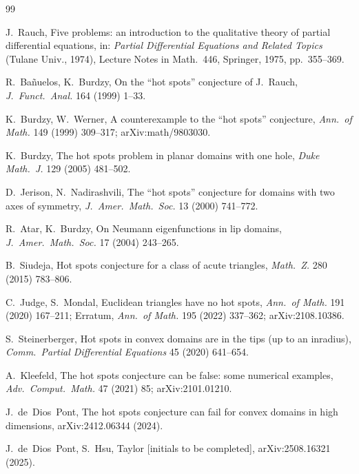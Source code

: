 \documentclass[11pt]{article}
\begin{document}
\begin{thebibliography}{99}\small

 J.~Rauch, Five problems: an introduction to the
qualitative theory of partial differential equations, in:
\emph{Partial Differential Equations and Related Topics} (Tulane
Univ., 1974), Lecture Notes in Math.\ 446, Springer, 1975, pp.~355--369.

 R.~Ba\~nuelos, K.~Burdzy, On the ``hot
spots'' conjecture of J.~Rauch, \emph{J.\ Funct.\ Anal.} 164 (1999)
1--33.

 K.~Burdzy, W.~Werner, A counterexample to the
``hot spots'' conjecture, \emph{Ann.\ of Math.} 149 (1999) 309--317;
arXiv:math/9803030.

 K.~Burdzy, The hot spots problem in planar
domains with one hole, \emph{Duke Math.\ J.} 129 (2005) 481--502.

 D.~Jerison, N.~Nadirashvili, The ``hot
spots'' conjecture for domains with two axes of symmetry, \emph{J.\
Amer.\ Math.\ Soc.} 13 (2000) 741--772.

 R.~Atar, K.~Burdzy, On Neumann eigenfunctions in
lip domains, \emph{J.\ Amer.\ Math.\ Soc.} 17 (2004) 243--265.

 B.~Siudeja, Hot spots conjecture for a class of
acute triangles, \emph{Math.\ Z.} 280 (2015) 783--806.

 C.~Judge, S.~Mondal, Euclidean triangles have no
hot spots, \emph{Ann.\ of Math.} 191 (2020) 167--211; Erratum,
\emph{Ann.\ of Math.} 195 (2022) 337--362; arXiv:2108.10386.

 S.~Steinerberger, Hot spots in convex domains
are in the tips (up to an inradius), \emph{Comm.\ Partial Differential
Equations} 45 (2020) 641--654.

 A.~Kleefeld, The hot spots conjecture can be false:
some numerical examples, \emph{Adv.\ Comput.\ Math.} 47 (2021) 85;
arXiv:2101.01210.

 J.~de~Dios~Pont, The hot spots conjecture can fail for
convex domains in high dimensions, arXiv:2412.06344 (2024).

 J.~de~Dios~Pont, S.~Hsu, Taylor
[initials to be completed], arXiv:2508.16321 (2025).


\end{thebibliography}
\end{document}
